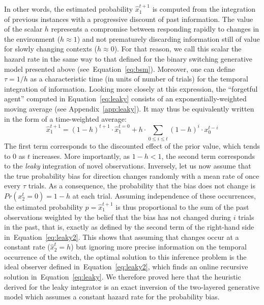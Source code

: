 \documentclass[10pt,letterpaper]{article}
\newcommand{\eql}[1]{\begin{equation}#1\end{equation}}
\newcommand{\seeEq}[1]{Equation~\ref{eq:#1}}
\newcommand{\seeApp}[1]{Appendix~\ref{app:#1}}
\begin{document}
In other words, the estimated probability $\hat{x}_1^{t+1}$ is computed
from the integration of previous instances
with a progressive discount of past information.
The value of the scalar $h$ represents
a compromise between responding rapidly
to changes in the environment ($h \approx 1$) and
not prematurely discarding information still of value
for slowly changing contexts  ($h \approx 0$).
For that reason, we call this scalar the hazard rate
in the same way to that defined for the binary switching generative model presented above (see~\seeEq{bsm}).
Moreover, one can define $\tau = 1 / h$ as
a characteristic time (in units of number of trials)
for the temporal integration of information.
Looking more closely at this expression,
the ``forgetful agent'' computed in \seeEq{leaky}
consists of an exponentially-weighted moving average (see \seeApp{leaky}).
It may thus be equivalently written in the form of a time-weighted average:
\eql{
\hat{x}_1^{t+1} = (1-h)^{t+1} \cdot \hat{x}_1^{t=0} + h \cdot \sum_{0\leq i \leq t} (1 - h)^{i} \cdot x_0^{t-i}
\label{eq:leaky2}}
The first term corresponds to the discounted effect of the prior value,
which tends to $0$ as $t$ increases.
More importantly, as $1-h < 1$, the second term corresponds to the \emph{leaky} integration of novel observations.
Inversely, let us now assume that
the true probability bias for direction changes randomly with a mean rate of once
every $\tau$ trials.
As a consequence, the probability that the bias does not change is $Pr(x_2^t=0)=1-h$ at each trial.
Assuming independence of these occurrences, the estimated probability $p=\hat{x}_1^{t+1}$ is thus proportional to the sum
of the past observations weighted by the belief that the bias has not changed during $i$ trials in the past, that is, exactly as defined by the second term of the right-hand side in~\seeEq{leaky2}.
This shows that assuming that changes occur at a constant rate ($\hat{x}_2^t=h$)
but ignoring more precise information on the temporal occurrence of the switch,
the optimal solution to this inference problem is the
ideal observer defined in~\seeEq{leaky2},
which finds an online recursive solution in~\seeEq{leaky}.
We therefore proved here that the heuristic derived for the leaky integrator
is an exact inversion of the two-layered generative model
which assumes a constant hazard rate for the probability bias.
\end{document}
